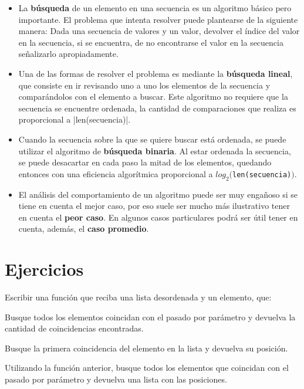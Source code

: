 \begin{itemize}

\item La {\bf búsqueda} de un elemento en una secuencia es un
algoritmo básico pero importante. El problema que intenta resolver puede
plantearse de la siguiente manera: Dada una secuencia de valores y un
valor, devolver el índice del valor en la secuencia, si se encuentra, de no
encontrarse el valor en la secuencia señalizarlo apropiadamente.

\item Una de las formas de resolver el problema es mediante la {\bf
búsqueda lineal}, que consiste en ir revisando uno a uno los elementos de
la secuencia y comparándolos con el elemento a buscar.  Este algoritmo no
requiere que la secuencia se encuentre ordenada, la cantidad de comparaciones
que realiza es proporcional a |len(secuencia)|.

\item Cuando la secuencia sobre la que se quiere buscar está ordenada, se
puede utilizar el algoritmo de {\bf búsqueda binaria}.  Al estar ordenada
la secuencia, se puede desacartar en cada paso la mitad de los elementos,
quedando entonces con una eficiencia algorítmica proporcional a
$log_2($\lstinline!len(secuencia)!$)$.

\item El análisis del comportamiento de un algoritmo puede ser muy engañoso
si se tiene en cuenta el mejor caso, por eso suele ser mucho más
ilustrativo tener en cuenta el {\bf peor caso}.  En algunos casos
particulares podrá ser útil tener en cuenta, además, el {\bf caso
promedio}.
\end{itemize}


\newpage
\section{Ejercicios}

\begin{ejercicio}
Escribir una función que reciba una lista desordenada y un elemento, que:
\begin{partes}
\item Busque todos los elementos coincidan con el pasado por parámetro y
devuelva la cantidad de coincidencias encontradas.
\item Busque la primera coincidencia del elemento en la lista y devuelva su
posición.
\item Utilizando la función anterior, busque todos los elementos que coincidan
con el pasado por parámetro y devuelva una lista con las posiciones.
\end{partes}
\end{ejercicio}


